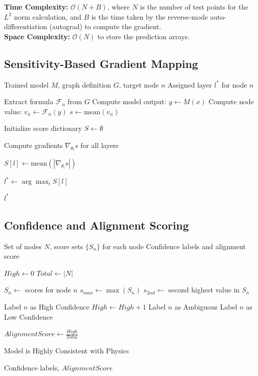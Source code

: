 \documentclass[12pt,singleside,a4paper]{article}
\begin{document}
\textbf{Time Complexity:} $\mathcal{O}(N + B)$, where $N$ is the number of test points for the $L^2$ norm calculation, and $B$ is the time taken by the reverse-mode auto-differentiation (autograd) to compute the gradient. \\
\textbf{Space Complexity:} $\mathcal{O}(N)$ to store the prediction arrays.

\subsection{Sensitivity-Based Gradient Mapping}
\begin{algorithm}[H]
\caption{Sensitivity-Based Gradient Mapping (Strategy for variables (not parameters)}
\begin{algorithmic}[1]
\Require Trained model $M$, graph definition $G$, target node $n$
\Ensure Assigned layer $l^*$ for node $n$

\State Extract formula $\mathcal{F}_n$ from $G$
\State Compute model output: $y \gets M(x)$
\State Compute node value: $v_n \gets \mathcal{F}_n(y)$
\State $s \gets \text{mean}(v_n)$

\State Initialize score dictionary $S \gets \emptyset$

\State Compute gradients $\nabla_{\theta_l} s$ for all layers

    \State $S[l] \gets \text{mean}(|\nabla_{\theta_l} s|)$
\EndFor

\State $l^* \gets \arg\max_{l} S[l]$

\State \Return $l^*$
\end{algorithmic}
\end{algorithm}

\subsection{Confidence and Alignment Scoring}
\begin{algorithm}[H]
\caption{Confidence and Alignment Scoring}
\begin{algorithmic}[1]
\Require Set of nodes $N$, score sets $\{S_n\}$ for each node
\Ensure Confidence labels and alignment score

\State $High \gets 0$
\State $Total \gets |N|$

    \State $S_n \gets$ scores for node $n$
    \State $s_{max} \gets \max(S_n)$
    \State $s_{2nd} \gets$ second highest value in $S_n$

        \State Label $n$ as High Confidence
        \State $High \gets High + 1$
        \State Label $n$ as Ambiguous
    \Else
        \State Label $n$ as Low Confidence
    \EndIf
\EndFor

\State $AlignmentScore \gets \frac{High}{Total}$

    \State Model is Highly Consistent with Physics
\EndIf

\State \Return Confidence labels, $AlignmentScore$
\end{algorithmic}
\end{algorithm}
\end{document}
